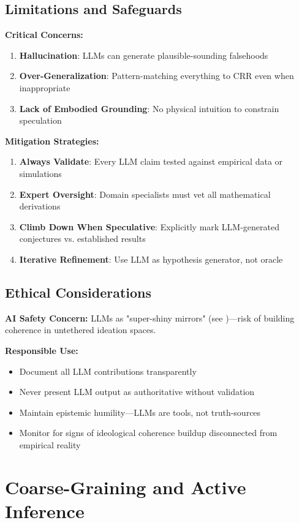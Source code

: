 \documentclass[11pt,a4paper]{article}
\theoremstyle{definition}
\theoremstyle{remark}
\begin{document}
\subsection{Limitations and Safeguards}

\textbf{Critical Concerns:}
\begin{enumerate}
\item \textbf{Hallucination}: LLMs can generate plausible-sounding falsehoods
\item \textbf{Over-Generalization}: Pattern-matching everything to CRR even when inappropriate
\item \textbf{Lack of Embodied Grounding}: No physical intuition to constrain speculation
\end{enumerate}

\textbf{Mitigation Strategies:}
\begin{enumerate}
\item \textbf{Always Validate}: Every LLM claim tested against empirical data or simulations
\item \textbf{Expert Oversight}: Domain specialists must vet all mathematical derivations
\item \textbf{Climb Down When Speculative}: Explicitly mark LLM-generated conjectures vs. established results
\item \textbf{Iterative Refinement}: Use LLM as hypothesis generator, not oracle
\end{enumerate}

\subsection{Ethical Considerations}

\textbf{AI Safety Concern:} LLMs as "super-shiny mirrors" (see )—risk of building coherence in untethered ideation spaces.

\textbf{Responsible Use:}
\begin{itemize}
\item Document all LLM contributions transparently
\item Never present LLM output as authoritative without validation
\item Maintain epistemic humility—LLMs are tools, not truth-sources
\item Monitor for signs of ideological coherence buildup disconnected from empirical reality
\end{itemize}

\section{Coarse-Graining and Active Inference}
\label{sec:coarse-grain}
\end{document}

